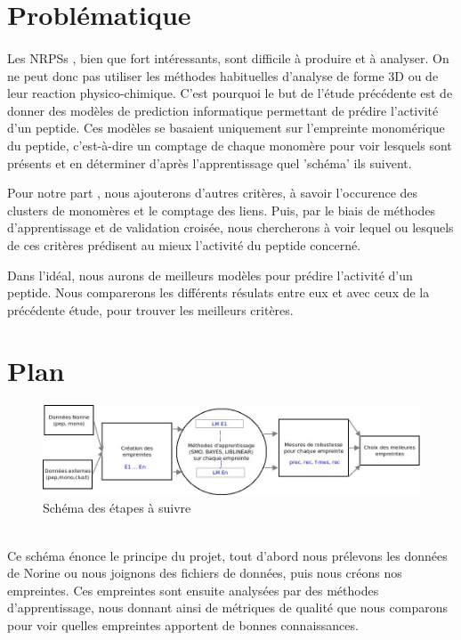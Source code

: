 \documentclass[a4paper,10pt]{report}
\begin{document}
	
	
      \section{Problématique}
	
	\paragraph{}
	  Les NRPSs , bien que fort intéressants, sont difficile à produire et à analyser. On ne peut donc pas utiliser les méthodes habituelles d'analyse de forme 3D ou de leur reaction physico-chimique.
	  C'est pourquoi le but de l'étude précédente est de donner des modèles de prediction informatique permettant de prédire l'activité d'un peptide.
	  Ces modèles se basaient uniquement sur l'empreinte monomérique du peptide, c'est-à-dire un comptage de chaque monomère pour voir lesquels sont présents et en déterminer d'après l'apprentissage quel 'schéma' ils suivent.

	  Pour notre part , nous ajouterons d'autres critères, à savoir l'occurence des clusters de monomères et le comptage des liens.
	  Puis, par le biais de méthodes d'apprentissage et de validation croisée, nous chercherons à voir lequel ou lesquels de ces critères prédisent au mieux l'activité du peptide concerné.
	  
	  Dans l'idéal, nous aurons de meilleurs modèles pour prédire l'activité d'un peptide. Nous comparerons les différents résulats entre eux et avec ceux de la précédente étude, pour trouver les meilleurs critères.
	
	
      \section{Plan}
	
	
	  \begin{figure}[hl]
	    \leftskip -2cm
	    \includegraphics[scale = 0.5]{image/Plan.jpeg}
	    \caption{Schéma des étapes à suivre}
	  \end{figure}
	
	  \\ Ce schéma énonce le principe du projet, tout d'abord nous prélevons les données de Norine ou nous joignons des fichiers de données, puis nous créons nos empreintes.  
	  Ces empreintes sont ensuite analysées par des méthodes d'apprentissage, nous donnant ainsi de métriques de qualité que nous comparons pour voir quelles empreintes apportent de bonnes connaissances.
	  
\end{document}
